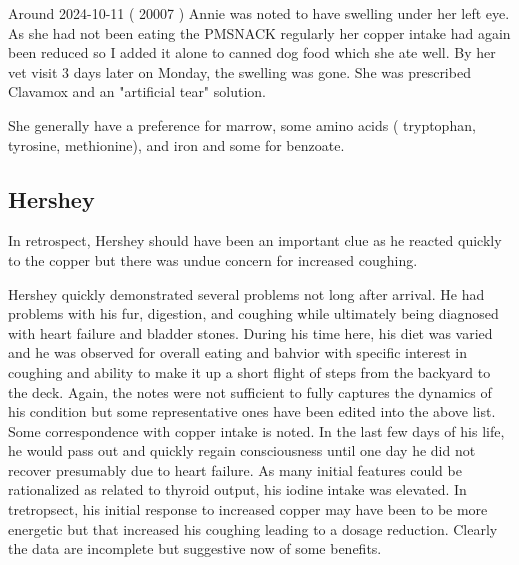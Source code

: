 Around 2024-10-11 ( 20007 )  Annie was noted to have swelling under her
left eye. As she had not been eating the PMSNACK regularly her
copper intake had again been reduced so I added it alone to 
canned dog food which she ate well. By her vet visit 3 days
later on Monday, the swelling was gone.  
She was prescribed Clavamox and an "artificial tear" solution.

She generally have a preference for marrow, some amino acids
( tryptophan, tyrosine, methionine), and iron and some
for benzoate.  

\subsection{Hershey}

In retrospect, Hershey should have been an important clue
as he reacted quickly to the copper but there was undue concern
for increased coughing.

\mjmhersheycu

\mjmhersheytable


Hershey quickly demonstrated several problems not long after arrival.
He had problems with his fur, digestion, and coughing while ultimately
being diagnosed with heart failure and bladder stones.
During his time here, his diet was varied and he was observed
for overall eating and bahvior with specific interest in 
coughing and ability to make it up a short flight of steps
from the backyard to the deck. Again, the notes were not sufficient
to fully captures the dynamics of his condition but some representative
ones have been edited into the above list. Some correspondence with
copper intake is noted. In the last few days of his life, he
would pass out and quickly regain consciousness until one day 
he did not recover presumably due to heart failure. 
As many initial features could be rationalized as related to thyroid output,
his iodine intake was elevated. 
In tretropsect, his initial response to increased copper may have been
to be more energetic but that increased his coughing leading
to a dosage reduction. Clearly the data are incomplete but suggestive
now of some benefits. 



